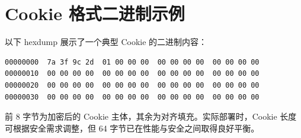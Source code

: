 \section{Cookie 格式二进制示例}
以下 hexdump 展示了一个典型 Cookie 的二进制内容：\par
\begin{lstlisting}
00000000  7a 3f 9c 2d  01 00 00 00  00 00 00 00  00 00 00 00
00000010  00 00 00 00  00 00 00 00  00 00 00 00  00 00 00 00
00000020  00 00 00 00  00 00 00 00  00 00 00 00  00 00 00 00
00000030  00 00 00 00  00 00 00 00  00 00 00 00  00 00 00 00
\end{lstlisting}
前 8 字节为加密后的 Cookie 主体，其余为对齐填充。实际部署时，Cookie 长度可根据安全需求调整，但 64 字节已在性能与安全之间取得良好平衡。\par
